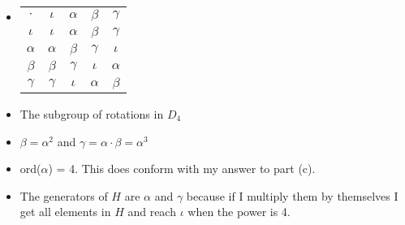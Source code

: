 \documentclass[titlepage]{article}
\newenvironment{problem}[2][Problem]{\begin{trivlist}
\item[\hskip \labelsep {\bfseries #1}\hskip \labelsep {\bfseries #2.}]}{\end{trivlist}}
\begin{document}
\begin{problem}{9}
\begin{itemize}
\item[(b)]  \begin{tabular}{c | c c c c}
    $\cdot$ & $\iota$ & $\alpha$ & $\beta$ & $\gamma$ \\
    \cline{1-5}
    $\iota$ & $\iota$ & $\alpha$ & $\beta$ & $\gamma$ \\
    $\alpha$ & $\alpha$ & $\beta$ &  $\gamma$ & $\iota$ \\
    $\beta$& $\beta$ & $\gamma$ & $\iota$ &$\alpha$\\
    $\gamma$ & $\gamma$ & $\iota$ & $\alpha$ & $\beta$ \\
\end{tabular}
\item[(c)] The subgroup of rotations in $D_4$
\item[(d)] $\beta = \alpha^2$ and $\gamma = \alpha\cdot\beta = \alpha^3$
\item[(e)] ord($\alpha$) = 4. This does conform with my answer to part (c).
\item[(f)] The generators of $H$ are $\alpha$ and $\gamma$ because if I multiply them by themselves I get all elements in $H$ and reach $\iota$ when the power is 4.
\end{itemize}
\end{problem}
\end{document}

